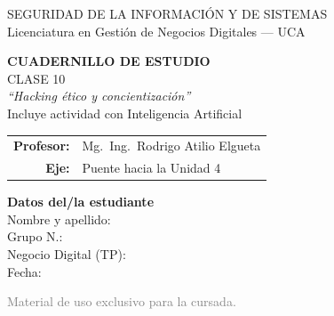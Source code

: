 \documentclass[12pt,a4paper]{article}
\begin{document}
\begin{titlepage}
\centering
\vspace*{1cm}

\begin{cajaTitulo}[width=\textwidth, halign=center]
  SEGURIDAD DE LA INFORMACI\'ON Y DE SISTEMAS\\[4pt]
  {\large Licenciatura en Gesti\'on de Negocios Digitales --- UCA}
\end{cajaTitulo}

\vspace{1.5cm}

{\Huge\bfseries\color{azulUCA} CUADERNILLO DE ESTUDIO}\\[8pt]
{\LARGE\color{doradoUCA} CLASE 10}\\[12pt]
{\Large\itshape ``Hacking \'etico y concientizaci\'on''}\\[6pt]
{\large\color{violetaIA}\; Incluye actividad con Inteligencia Artificial}\\[1.5cm]

\begin{tabular}{rl}
\textbf{Profesor:}   & Mg.\ Ing.\ Rodrigo Atilio Elgueta \\[4pt]
\textbf{Eje:}        & Puente hacia la Unidad 4 \\[4pt]
\end{tabular}

\vfill

\begin{tcolorbox}[colback=grisClaro, colframe=azulUCA, arc=3mm, width=0.9\textwidth]
  \centering
  {\bfseries Datos del/la estudiante}\\[10pt]
  Nombre y apellido: \underline{\hspace{5cm}}\\[10pt]
  Grupo N.\textdegree: \underline{\hspace{5cm}}\\[10pt]
  Negocio Digital (TP): \underline{\hspace{5cm}}\\[10pt]
  Fecha: \underline{\hspace{5cm}}
\end{tcolorbox}

\vspace{1cm}
{\small\textcolor{gray}{Material de uso exclusivo para la cursada.}}
\end{titlepage}
\end{document}
